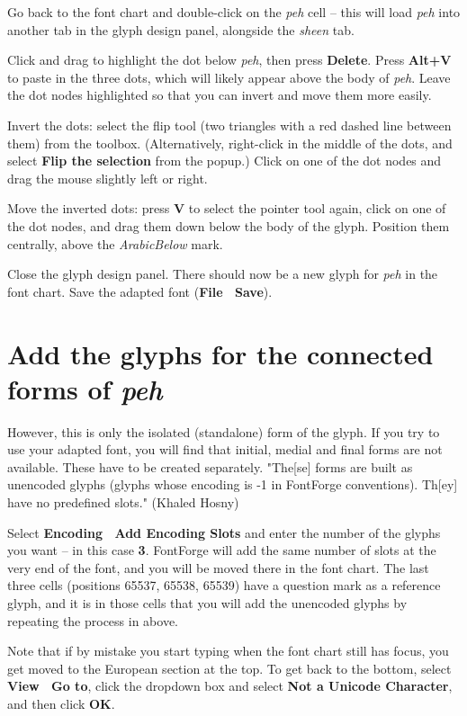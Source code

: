 Go back to the font chart and double-click on the \textit{peh} cell -- this will load \textit{peh} into another tab in the glyph design panel, alongside the \textit{sheen} tab.

Click and drag to highlight the dot below \textit{peh}, then press \textbf{Delete}.  Press \textbf{Alt+V} to paste in the three dots, which will likely appear above the body of \textit{peh}.  Leave the dot nodes highlighted so that you can invert and move them more easily.

Invert the dots: select the flip tool (two triangles with a red dashed line between them) from the toolbox.  (Alternatively, right-click in the middle of the dots, and select \textbf{Flip the selection} from the popup.)  Click on one of the dot nodes and drag the mouse slightly left or right.

Move the inverted dots: press \textbf{V} to select the pointer tool again, click on one of the dot nodes, and drag them down below the body of the glyph.  Position them centrally, above the \textit{ArabicBelow} mark.

Close the glyph design panel. There should now be a new glyph for \textit{peh} in the font chart.  Save the adapted font (\textbf{File \textrightarrow\ Save}).


\section{Add the glyphs for the connected forms of \textit{peh}}

However, this is only the isolated (standalone) form of the glyph.  If you try to use your adapted font, you will find that initial, medial and final forms are not available.  These have to be created separately.  "The[se] forms are built as unencoded glyphs (glyphs whose encoding is -1 in FontForge conventions).  Th[ey] have no predefined slots." (Khaled Hosny)

Select \textbf{Encoding \textrightarrow\ Add Encoding Slots} and enter the number of the glyphs you want -- in this case \textbf{3}.  FontForge will add the same number of slots at the very end of the font, and you will be moved there in the font chart.  The last three cells (positions 65537, 65538, 65539) have a question mark as a reference glyph, and it is in those cells that you will add the unencoded glyphs by repeating the process in  above.

Note that if by mistake you start typing when the font chart still has focus, you get moved to the European section at the top.  To get back to the bottom, select \textbf{View \textrightarrow\ Go to}, click the dropdown box and select \textbf{Not a Unicode Character},  and then click \textbf{OK}.


